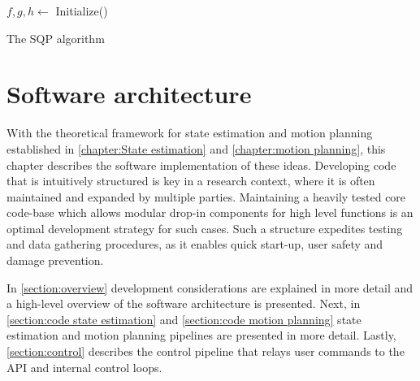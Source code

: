 \documentclass[times, utf8, diplomski, english]{fer}
\begin{document}
\begin{algorithm}[h]
 $f,g,h \leftarrow$ Initialize()
 \caption{The SQP algorithm}
 \label{algorithm:sqp}
\end{algorithm}










\chapter{Software architecture}
With the theoretical framework for state estimation and motion planning established in \autoref{chapter:State estimation} and \autoref{chapter:motion planning}, this chapter describes the software implementation of these ideas.
Developing code that is intuitively structured is key in a research context, where it is often maintained and expanded by multiple parties.
Maintaining a heavily tested core code-base which allows modular drop-in components for high level functions is an optimal development strategy for such cases.
Such a structure expedites testing and data gathering procedures, as it enables quick start-up, user safety and damage prevention.

In \autoref{section:overview} development considerations are explained in more detail and a high-level overview of the software architecture is presented.
Next, in \autoref{section:code state estimation} and \autoref{section:code motion planning} state estimation and motion planning pipelines are presented in more detail.%
Lastly, \autoref{section:control} describes the control pipeline that relays user commands to the API and internal control loops. %
\end{document}
